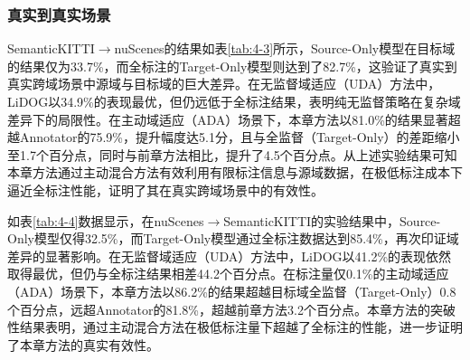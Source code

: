 
    \subsubsection{真实到真实场景}
    SemanticKITTI$\to$nuScenes的结果如表\ref{tab:4-3}所示，Source-Only模型在目标域的结果仅为33.7\%，而全标注的Target-Only模型则达到了82.7\%，这验证了真实到真实跨域场景中源域与目标域的巨大差异。在无监督域适应（UDA）方法中，LiDOG以34.9\%的表现最优，但仍远低于全标注结果，表明纯无监督策略在复杂域差异下的局限性。在主动域适应（ADA）场景下，本章方法以81.0\%的结果显著超越Annotator的75.9\%，提升幅度达5.1分，且与全监督（Target-Only）的差距缩小至1.7个百分点，同时与前章方法相比，提升了4.5个百分点。从上述实验结果可知本章方法通过主动混合方法有效利用有限标注信息与源域数据，在极低标注成本下逼近全标注性能，证明了其在真实跨域场景中的有效性。
    
    如表\ref{tab:4-4}数据显示，在nuScenes$\to$SemanticKITTI的实验结果中，Source-Only模型仅得32.5\%，而Target-Only模型通过全标注数据达到85.4\%，再次印证域差异的显著影响。在无监督域适应（UDA）方法中，LiDOG以41.2\%的表现依然取得最优，但仍与全标注结果相差44.2个百分点。在标注量仅0.1\%的主动域适应（ADA）场景下，本章方法以86.2\%的结果超越目标域全监督（Target-Only）0.8个百分点，远超Annotator的81.8\%，超越前章方法3.2个百分点。本章方法的突破性结果表明，通过主动混合方法在极低标注量下超越了全标注的性能，进一步证明了本章方法的真实有效性。
    
